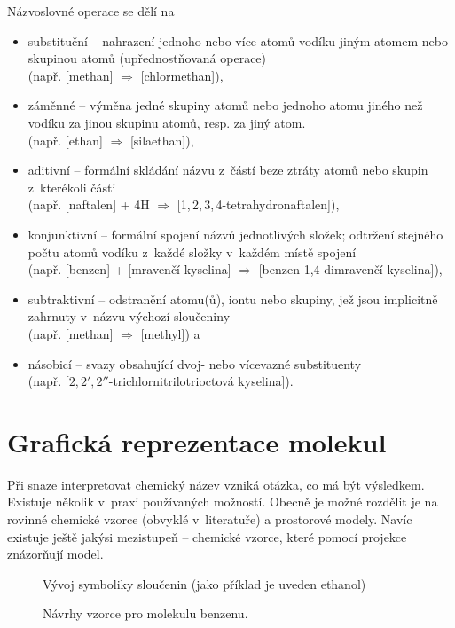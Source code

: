 Názvoslovné operace se dělí na
\begin{itemize}
	\item substituční -- nahrazení jednoho nebo více atomů vodíku jiným atomem
						 nebo skupinou atomů (upřednostňovaná operace) \\
						(např.  [methan] $\Rightarrow$  [chlormethan]),
	\item záměnné -- výměna jedné skupiny atomů nebo jednoho atomu jiného než
					 vodíku za jinou skupinu atomů, resp. za jiný atom. \\
					 (např.  [ethan] $\Rightarrow$  [silaethan]),
	\item aditivní -- formální skládání názvu z~částí beze ztráty atomů nebo
					  skupin z~kterékoli části \\
					  (např.  [naftalen] + 4H $\Rightarrow$  [1,\,2,\,3,\,4-tetrahydronaftalen]),
	\item konjunktivní -- formální spojení názvů jednotlivých složek; odtržení
						  stejného počtu atomů vodíku z~každé složky v~každém
						  místě spojení \\
						  (např.  [benzen] +  [mravenčí kyselina] $\Rightarrow$  [benzen-1,4-dimravenčí kyselina]),
	\item subtraktivní -- odstranění atomu(ů), iontu nebo skupiny, jež jsou
						  implicitně zahrnuty v~názvu výchozí sloučeniny \\
						  (např.  [methan] $\Rightarrow$  [methyl]) a
	\item násobicí -- svazy obsahující dvoj- nebo vícevazné substituenty \\
					 (např.  [$2,2',2''$-trichlornitrilotrioctová kyselina]).
\end{itemize}

\section{Grafická reprezentace molekul\cite{Mysicka:vzorce}}
Při snaze interpretovat chemický název vzniká otázka, co má být výsledkem.
Existuje několik v~praxi používaných možností. Obecně je možné rozdělit je na
rovinné chemické vzorce (obvyklé v~literatuře) a prostorové modely. Navíc
existuje ještě jakýsi mezistupeň -- chemické vzorce, které pomocí projekce
znázorňují model.

\begin{figure}
	\caption{Vývoj symboliky sloučenin (jako příklad je uveden ethanol)
				\cite{Dalton:newsystem}
			}
\end{figure}
\begin{figure}
	\caption{\label{pic:benzeny}Návrhy vzorce pro molekulu benzenu.}
\end{figure}

